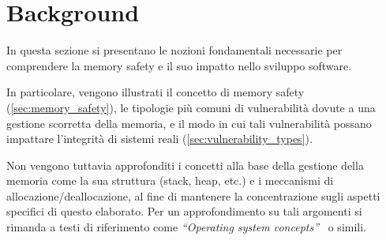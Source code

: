 \chapter{Background}
\label{cha:background}

In questa sezione si presentano le nozioni fondamentali necessarie per
comprendere la memory safety e il suo impatto nello sviluppo software.

In particolare, vengono illustrati il concetto di memory safety (\autoref{sec:memory_safety}),
le tipologie più comuni di vulnerabilità dovute a una gestione scorretta della
memoria, e il modo in cui tali vulnerabilità possano impattare l'integrità di sistemi
reali (\autoref{sec:vulnerability_types}).

Non vengono tuttavia approfonditi i concetti alla base della gestione della memoria
come la sua struttura (stack, heap, etc.) e i meccanismi di allocazione/deallocazione,
al fine di mantenere la concentrazione sugli aspetti specifici di questo elaborato.
Per un approfondimento su tali argomenti si rimanda a testi di riferimento come
\textit{``Operating system concepts''}~\cite{os_concepts} o simili.



